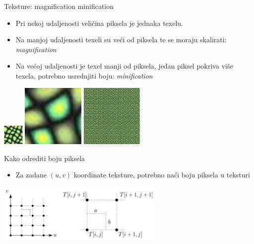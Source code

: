\documentclass[9pt]{beamer}
\begin{document}
\begin{frame}{Teksture: magnification minification}
	\begin{itemize}
		\item Pri nekoj udaljenosti veličina piksela je jednaka texelu.
		\item Na manjoj udaljenosti texeli su veći od piksela te se moraju skalirati: \textit{magnification}
		\item Na većoj udaljenosti je texel manji od piksela, jedan piksel pokriva više texela, potrebno usrednjiti boju:
		\textit{minification}
	\end{itemize}
	\begin{center}
		\includegraphics[width=1cm]{slike/teksture_mm_01.png} \hspace{0.5cm} 
		\includegraphics[width=3cm]{slike/teksture_mm_02.png} \hspace{0.5cm} 
		\includegraphics[width=3cm]{slike/teksture_mm_03.png}
	\end{center}
\end{frame}
%
\begin{frame}{Kako odrediti boju piksela}
	\begin{itemize}
		\item Za zadane $(u,v)$ koordinate teksture, potrebno naći boju piksela u teksturi
	\end{itemize}
	\begin{center}
		\includegraphics[width=8cm]{slike/pixel_rgb_color.png}
	\end{center}
	
\end{frame}
\end{document}
